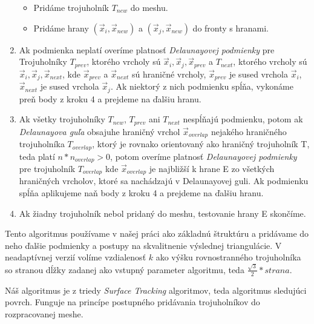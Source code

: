 \begin{enumerate}
{\begin{itemize}
        \item{Pridáme trojuholník $T_{new}$ do meshu.}
        \item{Pridáme hrany $(\overrightarrow{x}_i, \overrightarrow{x}_{new})$ a 
        $(\overrightarrow{x}_j, \overrightarrow{x}_{new})$ do fronty s hranami.}
    \end{itemize}
    }
    \item{
        Ak podmienka neplatí overíme platnosť \textit{Delaunayovej podmienky} pre Trojuholníky 
        $T_{prev}$, ktorého vrcholy sú $\overrightarrow{x}_i, \overrightarrow{x}_j, 
        \overrightarrow{x}_{prev}$ a $T_{next}$, ktorého vrcholy sú 
        $\overrightarrow{x}_i, \overrightarrow{x}_j, \overrightarrow{x}_{next}$, kde 
        $\overrightarrow{x}_{prev}$ a $\overrightarrow{x}_{next}$ sú hraničné vrcholy, 
        $\overrightarrow{x}_{prev}$ 
        je sused vrchola $\overrightarrow{x}_i$, $\overrightarrow{x}_{next}$ je sused vrchola 
        $\overrightarrow{x}_j$. Ak niektorý z nich podmienku
        spĺňa, vykonáme preň body z kroku 4 a prejdeme na ďalšiu hranu.
    }
    \item{
        Ak všetky trojuholníky $T_{new}$, $T_{prev}$ ani $T_{next}$ nespĺňajú podmienku, potom 
        ak \textit{Delaunayova guľa} obsajuhe hraničný vrchol $\overrightarrow{x}_{overlap}$ nejakého hraničného 
        trojuholníka $T_{overlap}$, ktorý je rovnako orientovaný ako hraničný trojuholník T, teda
        platí $n*n_{overlap} > 0$, potom overíme platnosť \textit{Delaunayovej podmienky} pre 
        trojuholník $T_{overlap}$ kde $\overrightarrow{x}_{overlap}$ je najbližší k hrane E zo všetkých hraničných
        vrcholov, ktoré sa nachádzajú v Delaunayovej guli. Ak podmienku spĺňa aplikujeme naň body z 
        kroku 4 a prejdeme na ďalšiu hranu.
    }
    \item{
        Ak žiadny trojuholník nebol pridaný do meshu, testovanie hrany E skončíme.
    }
\end{enumerate}

Tento algoritmus používame v našej práci ako základnú štruktúru a pridávame do neho ďalšie podmienky 
a postupy na skvalitnenie výslednej triangulácie. V neadaptívnej verzií volíme vzdialenosť $k$ ako 
výšku rovnostranného trojuholníka so stranou dĺžky zadanej ako vstupný parameter algoritmu, teda 
$\frac{\sqrt{3}}{2}*strana$.

Náš algoritmus je z triedy \textit{Surface Tracking} algoritmov, teda algoritmus sledujúci povrch.
Funguje na princípe postupného pridávania trojuholníkov do rozpracovanej meshe.

